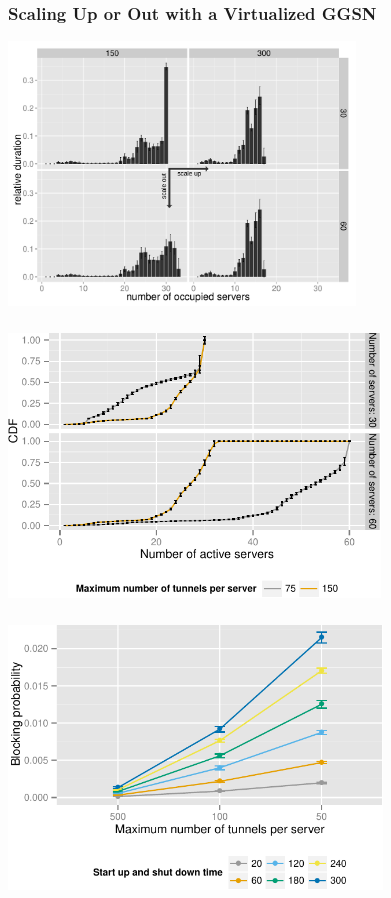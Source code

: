 \documentclass{beamer}
\begin{document}
\begin{frame}
	\frametitle{Scaling Up or Out with a Virtualized GGSN}
	
	\begin{center}
		\includegraphics[height=7cm]{figures/resourceusedistribution-detail-barplot-annotated.pdf}
	\end{center}
\end{frame}


\begin{frame}
	\frametitle{}

	\begin{center}
		\includegraphics[height=7cm]{figures/instanceuse-multiserver-real.pdf}
	\end{center}
\end{frame}

\begin{frame}
	\frametitle{}

	\begin{center}
		\includegraphics[height=7cm]{figures/compare-maxinstances-block.pdf}
	\end{center}
\end{frame}
\end{document}
